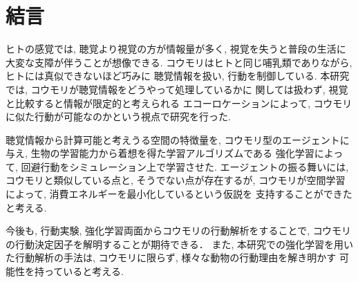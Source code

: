 \documentclass[../main]{subfiles}
\begin{document}
\newpage
\chapter*{結言}
\label{chap:summary}
ヒトの感覚では, 聴覚より視覚の方が情報量が多く, 
視覚を失うと普段の生活に大変な支障が伴うことが想像できる.
コウモリはヒトと同じ哺乳類でありながら, 
ヒトには真似できないほど巧みに
聴覚情報を扱い, 行動を制御している.
本研究では, コウモリが聴覚情報をどうやって処理しているかに
関しては扱わず, 
視覚と比較すると情報が限定的と考えられる
エコーロケーションによって,
コウモリに似た行動が可能なのかという視点で研究を行った.


聴覚情報から計算可能と考えうる空間の特徴量を, 
コウモリ型のエージェントに与え, 
生物の学習能力から着想を得た学習アルゴリズムである 
強化学習によって, 回避行動をシミュレーション上で学習させた.
エージェントの振る舞いには, 
コウモリと類似している点と, そうでない点が存在するが, 
コウモリが空間学習によって, 
消費エネルギーを最小化しているという仮説を
支持することができたと考える.

今後も, 行動実験, 強化学習両面からコウモリの行動解析をすることで, 
コウモリの行動決定因子を解明することが期待できる．
また, 本研究での強化学習を用いた行動解析の手法は, 
コウモリに限らず, 様々な動物の行動理由を解き明かす
可能性を持っていると考える.
\end{document}
